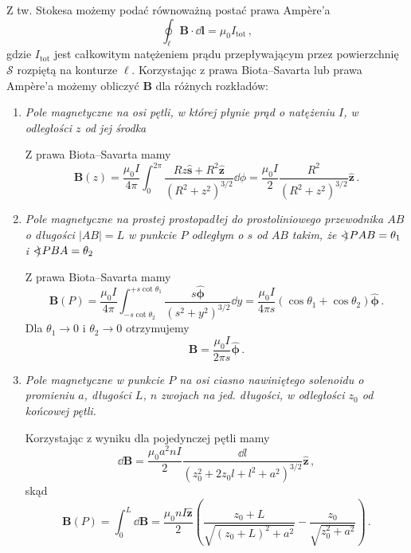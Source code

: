 \documentclass[../main.tex]{subfiles}
\begin{document}
\noindent Z tw. Stokesa możemy podać równoważną postać prawa Ampère'a
\begin{equation*}
    \oint_\ell\mathbf{B}\cdot\dd{\mathbf{l}}=\mu_0I_\text{tot}\,,
\end{equation*}
gdzie \(I_\text{tot}\) jest całkowitym natężeniem prądu przepływającym przez powierzchnię \(\mathcal{S}\) rozpiętą na konturze \(\ell\). Korzystając z prawa Biota--Savarta lub prawa Ampère'a możemy obliczyć \(\mathbf{B}\) dla różnych rozkładów:
\begin{enumerate}
    \item \textit{Pole magnetyczne na osi pętli, w której płynie prąd o natężeniu \(I\), w odległości \(z\) od jej środka}
    \medskip
    
    Z prawa Biota--Savarta mamy
    \begin{equation*}
        \mathbf{B}(z)=\frac{\mu_0I}{4\pi}\int_0^{2\pi}\frac{Rz\mathbf{\hat{s}}+R^2\mathbf{\hat{z}}}{(R^2+z^2)^{3/2}}\dd{\phi}=\frac{\mu_0I}{2}\frac{R^2}{(R^2+z^2)^{3/2}}\mathbf{\hat{z}}\,.
    \end{equation*}
    
    \item \textit{Pole magnetyczne na prostej prostopadłej do prostoliniowego przewodnika \(AB\) o długości \(|AB|=L\) w punkcie \(P\) odległym o \(s\) od \(AB\) takim, że \(\mathord{<\mspace{-9mu}\mathrel{)}\mspace{2mu}} PAB=\theta_1\) i \(\mathord{<\mspace{-9mu}\mathrel{)}\mspace{2mu}} PBA=\theta_2\)}
    \medskip
    
    Z prawa Biota--Savarta mamy
    \begin{equation*}
        \mathbf{B}(P)=\frac{\mu_0I}{4\pi}\int_{-s\cot\theta_2}^{+s\cot\theta_1}\frac{s\boldsymbol{\hat{\phi}}}{(s^2+y^2)^{3/2}}\dd{y}=\frac{\mu_0I}{4\pi s}(\cos\theta_1+\cos\theta_2)\boldsymbol{\hat{\phi}}\,.
    \end{equation*}
    Dla \(\theta_1\to0\) i \(\theta_2\to0\) otrzymujemy
    \begin{equation*}
        \mathbf{B}=\frac{\mu_0I}{2\pi s}\boldsymbol{\hat{\phi}}\,.
    \end{equation*}
    
    \item \textit{Pole magnetyczne w punkcie \(P\) na osi ciasno nawiniętego solenoidu o promieniu \(a\), długości \(L\), \(n\) zwojach na jed. długości, w odległości \(z_0\) od końcowej pętli.}
    \medskip
    
    Korzystając z wyniku dla pojedynczej pętli mamy
    \begin{equation*}
        \dd{\mathbf{B}}=\frac{\mu_0a^2nI}{2}\frac{\dd{l}}{(z_0^2+2z_0l+l^2+a^2)^{3/2}}\mathbf{\hat{z}}\,,
    \end{equation*}
    skąd
    \begin{equation*}
        \mathbf{B}(P)=\int_0^L\dd{\mathbf{B}}=\frac{\mu_0nI\mathbf{\hat{z}}}{2}\left(\frac{z_0+L}{\sqrt{(z_0+L)^2+a^2}}-\frac{z_0}{\sqrt{z_0^2+a^2}}\right)\,.
    \end{equation*}
    

\end{enumerate}
\end{document}

